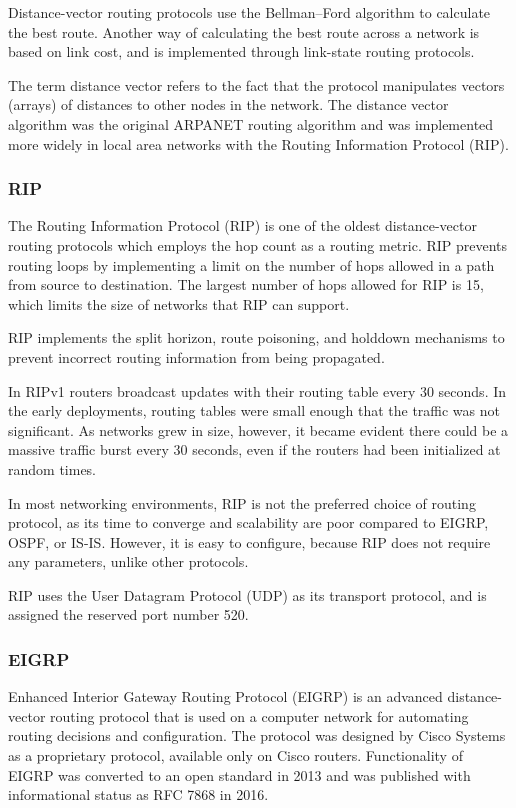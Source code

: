 \documentclass[a4paper,12pt]{book}
\begin{document}
Distance-vector routing protocols use the Bellman–Ford algorithm to calculate the best route. Another way of calculating the best route across a network is based on link cost, and is implemented through link-state routing protocols.

The term distance vector refers to the fact that the protocol manipulates vectors (arrays) of distances to other nodes in the network. The distance vector algorithm was the original ARPANET routing algorithm and was implemented more widely in local area networks with the Routing Information Protocol (RIP).

\subsubsection{RIP}
The Routing Information Protocol (RIP) is one of the oldest distance-vector routing protocols which employs the hop count as a routing metric. RIP prevents routing loops by implementing a limit on the number of hops allowed in a path from source to destination. The largest number of hops allowed for RIP is 15, which limits the size of networks that RIP can support.

RIP implements the split horizon, route poisoning, and holddown mechanisms to prevent incorrect routing information from being propagated.

In RIPv1 routers broadcast updates with their routing table every 30 seconds. In the early deployments, routing tables were small enough that the traffic was not significant. As networks grew in size, however, it became evident there could be a massive traffic burst every 30 seconds, even if the routers had been initialized at random times.

In most networking environments, RIP is not the preferred choice of routing protocol, as its time to converge and scalability are poor compared to EIGRP, OSPF, or IS-IS. However, it is easy to configure, because RIP does not require any parameters, unlike other protocols.

RIP uses the User Datagram Protocol (UDP) as its transport protocol, and is assigned the reserved port number 520.

\subsubsection{EIGRP}
Enhanced Interior Gateway Routing Protocol (EIGRP) is an advanced distance-vector routing protocol that is used on a computer network for automating routing decisions and configuration. The protocol was designed by Cisco Systems as a proprietary protocol, available only on Cisco routers. Functionality of EIGRP was converted to an open standard in 2013 and was published with informational status as RFC 7868 in 2016.
\end{document}
